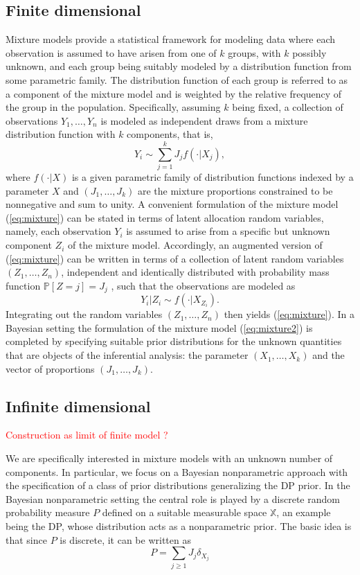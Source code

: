 \subsection{Finite dimensional}
Mixture models provide a statistical framework for modeling data where each observation is assumed to have arisen from one of $k$ groups, with $k$ possibly unknown, and each group being suitably modeled by a distribution function from some parametric family. The distribution function of each group is referred to as a component of the mixture model and is weighted by the relative frequency of the group in the population. Specifically, assuming $k$ being fixed, a collection of observations $Y_1,\dots,Y_n$ is modeled as independent draws from a mixture distribution function with $k$ components, that is,
\begin{equation} \label{eq:mixture}
Y_i \sim \sum_{j=1}^k{J_j f(\cdot|X_j)},
\end{equation}
where $f(\cdot|X)$ is a given parametric family of distribution functions indexed by a parameter $X$ and
$(J_1, \dots, J_k)$ are the mixture proportions constrained to be nonnegative and sum to unity. A convenient formulation of the mixture model (\ref{eq:mixture}) can be stated in terms of latent allocation random variables, namely, each observation $Y_i$ is assumed to arise from a specific but unknown component $Z_i$ of the mixture model. Accordingly, an augmented version of (\ref{eq:mixture}) can be written in terms of a collection of latent random variables $(Z_1, \dots , Z_n)$, independent and identically distributed with probability mass function $\mathbb{P}[Z = j] = J_j$ , such that the observations are modeled as
\begin{equation} \label{eq:mixture2}
Y_i|Z_i \sim f(\cdot|X_{Z_i}).
\end{equation}
Integrating out the random variables $(Z_1, \dots , Z_n)$ then yields (\ref{eq:mixture}). In a Bayesian setting the formulation of the mixture model (\ref{eq:mixture2}) is completed by specifying suitable prior distributions for the unknown quantities that are objects of the inferential analysis: the parameter $(X_1, \dots, X_k)$ and the vector of proportions $(J_1, \dots, J_k)$.

\subsection{Infinite dimensional}
\textcolor{red}{Construction as limit of finite model ?}

We are specifically interested in mixture models with an unknown number of components. In particular, we focus on a Bayesian nonparametric approach with the specification of a class of prior distributions generalizing the \gls{DP} prior. In the Bayesian nonparametric setting the central role is played by a discrete random probability measure $P$ defined on a suitable measurable space $\mathbb{X}$, an example being the \gls{DP}, whose distribution acts as a nonparametric prior. The basic idea is that since $P$ is discrete, it can be written as
\begin{equation*}
P = \sum_{j \ge 1}{J_j \delta_{X_j}}
\end{equation*}


